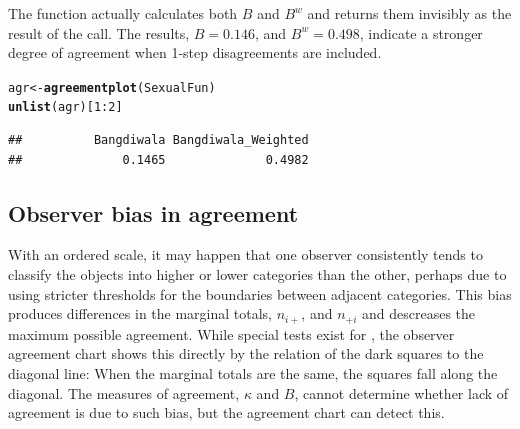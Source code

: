 \documentclass[11pt]{book}\usepackage[]{graphicx}\usepackage[]{color}
\makeatletter
\newcommand{\hlnum}[1]{\textcolor[rgb]{0.686,0.059,0.569}{#1}}%
\newcommand{\hlopt}[1]{\textcolor[rgb]{0,0,0}{#1}}%
\newcommand{\hlstd}[1]{\textcolor[rgb]{0.345,0.345,0.345}{#1}}%
\newcommand{\hlkwb}[1]{\textcolor[rgb]{0.69,0.353,0.396}{#1}}%
\newcommand{\hlkwd}[1]{\textcolor[rgb]{0.737,0.353,0.396}{\textbf{#1}}}%
\newenvironment{kframe}{%
 \def\at@end@of@kframe{}%
 \ifinner\ifhmode%
  \def\at@end@of@kframe{\end{minipage}}%
  \begin{minipage}{\columnwidth}%
 \fi\fi%
 \def\FrameCommand##1{\hskip\@totalleftmargin \hskip-\fboxsep
 \colorbox{shadecolor}{##1}\hskip-\fboxsep
     \hskip-\linewidth \hskip-\@totalleftmargin \hskip\columnwidth}%
 \MakeFramed {\advance\hsize-\width
   \@totalleftmargin\z@ \linewidth\hsize
   \@setminipage}}%
 {\par\unskip\endMakeFramed%
 \at@end@of@kframe}
\newenvironment{knitrout}{}{} %
\renewenvironment{knitrout}{\small\renewcommand{\baselinestretch}{.85}}{} %
\makeatother
\begin{document}
The function  actually calculates both $B$ and $B^w$
and returns them invisibly as the result of the call.
The results, $B = 0.146$, and $B^w = 0.498$, indicate a stronger
degree of agreement when 1-step disagreements are included.
\begin{knitrout}
\color{fgcolor}\begin{kframe}
\begin{alltt}
\hlstd{agr} \hlkwb{<-}\hlkwd{agreementplot}\hlstd{(SexualFun)}
\hlkwd{unlist}\hlstd{(agr)[}\hlnum{1}\hlopt{:}\hlnum{2}\hlstd{]}
\end{alltt}
\begin{verbatim}
##          Bangdiwala Bangdiwala_Weighted 
##              0.1465              0.4982
\end{verbatim}
\end{kframe}
\end{knitrout}


\subsection{Observer bias in agreement}\label{sec:twoway-observer}

With an ordered scale, it may happen that one observer consistently
tends to classify the objects into higher or lower categories than
the other, perhaps due to using stricter thresholds for the
boundaries between adjacent categories.
This bias produces differences in the marginal totals,
\(n_{i+}\), and \(n_{+i}\) and descreases the maximum possible agreement.  
While special tests exist for
, the observer agreement chart shows this
directly by the relation of the dark squares to the diagonal line:
When the marginal totals are the same, the squares fall along the
diagonal.
The measures of agreement, $\kappa$ and $B$, cannot determine
whether lack of agreement is due to such bias, but the agreement chart can
detect this.
\end{document}
